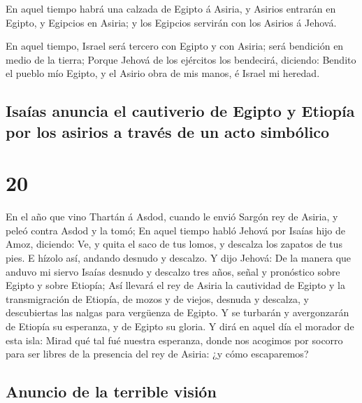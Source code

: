  En aquel tiempo habrá una calzada de Egipto á Asiria, y
Asirios entrarán en Egipto, y Egipcios en Asiria; y los Egipcios
servirán con los Asirios á Jehová.

 En aquel tiempo, Israel será tercero con Egipto y con
Asiria; será bendición en medio de la tierra;  Porque
Jehová de los ejércitos los bendecirá, diciendo: Bendito el pueblo mío
Egipto, y el Asirio obra de mis manos, é Israel mi heredad.

\hypertarget{isauxedas-anuncia-el-cautiverio-de-egipto-y-etiopuxeda-por-los-asirios-a-travuxe9s-de-un-acto-simbuxf3lico}{%
\subsection{Isaías anuncia el cautiverio de Egipto y Etiopía por los
asirios a través de un acto
simbólico}\label{isauxedas-anuncia-el-cautiverio-de-egipto-y-etiopuxeda-por-los-asirios-a-travuxe9s-de-un-acto-simbuxf3lico}}

\hypertarget{section-19}{%
\section{20}\label{section-19}}

 En el año que vino Thartán á Asdod, cuando le envió Sargón
rey de Asiria, y peleó contra Asdod y la tomó;  En aquel
tiempo habló Jehová por Isaías hijo de Amoz, diciendo: Ve, y quita el
saco de tus lomos, y descalza los zapatos de tus pies. E hízolo así,
andando desnudo y descalzo.  Y dijo Jehová: De la manera que
anduvo mi siervo Isaías desnudo y descalzo tres años, señal y pronóstico
sobre Egipto y sobre Etiopía;  Así llevará el rey de Asiria
la cautividad de Egipto y la transmigración de Etiopía, de mozos y de
viejos, desnuda y descalza, y descubiertas las nalgas para vergüenza de
Egipto.  Y se turbarán y avergonzarán de Etiopía su
esperanza, y de Egipto su gloria.  Y dirá en aquel día el
morador de esta isla: Mirad qué tal fué nuestra esperanza, donde nos
acogimos por socorro para ser libres de la presencia del rey de Asiria:
¿y cómo escaparemos?

\hypertarget{anuncio-de-la-terrible-visiuxf3n}{%
\subsection{Anuncio de la terrible
visión}\label{anuncio-de-la-terrible-visiuxf3n}}

